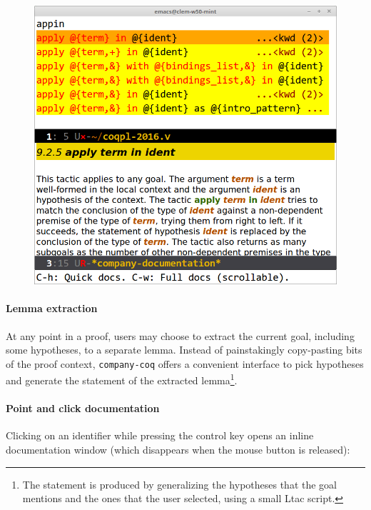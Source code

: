 \documentclass[preprint]{sigplanconf}
\begin{document}
\begin{figure}[H]
  \centering
  \includegraphics[width=\linewidth]{docs-xxl-2.png}
\end{figure}

\paragraph{Lemma extraction} At any point in a proof, users may choose to extract the current goal, including some hypotheses, to a separate lemma. Instead of painstakingly copy-pasting bits of the proof context, \texttt{company-coq} offers a convenient interface to pick hypotheses and generate the statement of the extracted lemma\footnote{The statement is produced by generalizing the hypotheses that the goal mentions and the ones that the user selected, using a small Ltac script.}.

\paragraph{Point and click documentation} Clicking on an identifier while
pressing the control key opens an inline documentation window (which disappears
when the mouse button is released):
\end{document}
